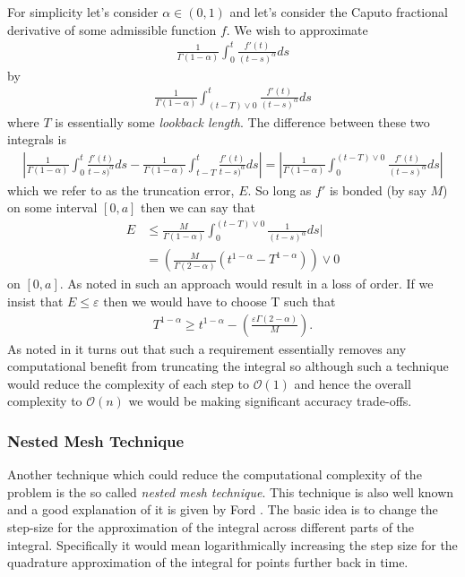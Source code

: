 For simplicity let's consider $ \alpha \in (0, 1) $ and let's consider the Caputo fractional derivative of some admissible function $ f $.
We wish to approximate
\begin{align}
	\frac{1}{\Gamma(1-\alpha)} \int_0^t \frac{f'(t)}{(t-s)^\alpha} ds
\end{align}
by
\begin{align}
	\frac{1}{\Gamma(1-\alpha)} \int_{({t-T})\vee 0}^t \frac{f'(t)}{(t-s)^\alpha} ds
\end{align}
where $ T $ is essentially some \emph{lookback length}.
The difference between these two integrals is 
\begin{align}
	\left| \frac{1}{\Gamma(1-\alpha)} \int_0^t \frac{f'(t)}{t-s)^\alpha} ds - \frac{1}{\Gamma(1-\alpha)} \int_{t-T}^t \frac{f'(t)}{t-s)^\alpha} ds \right| =  \left| \frac{1}{\Gamma(1-\alpha)} \int_{0}^{({t-T})\vee 0} \frac{f'(t)}{(t-s)^\alpha} ds \right|
\end{align}
which we refer to as the truncation error, $E$. So long as $ f' $ is bonded (by say $ M $) on some interval $ [0,a] $ then we can say that 
\begin{align}
	E &\leq \frac{M}{\Gamma(1-\alpha)} \int_0^{({t-T})\vee 0} \frac{1}{(t-s)^\alpha} ds| \\
		&= \left(\frac{M}{\Gamma(2 - \alpha)} (t^{1-\alpha} - T^{1-\alpha})\right)\vee 0
\end{align}
on $ [0,a] $.
As noted in \cite{Ford2001} such an approach would result in a loss of order. If we insist that $ E \leq \varepsilon $ then we would have to choose T such that
\begin{align}
	T^{1-\alpha} \geq t^{1-\alpha} - \left( \frac{\varepsilon \Gamma(2 - \alpha)}{M}\right).
\end{align}
As noted in \cite{Ford2001} it turns out that such a requirement essentially removes any computational benefit from truncating the integral so although such a technique would reduce the complexity of each step to $ \mathcal{O}(1) $ and hence the overall complexity to $ \mathcal{O}(n) $ we would be making significant accuracy trade-offs.

\subsubsection{Nested Mesh Technique}

Another technique which could reduce the computational complexity of the problem is the so called \emph{nested mesh technique}. This technique is also well known and a good explanation of it is given by Ford \cite{Ford2001}. The basic idea is to change the step-size for the approximation of the integral across different parts of the integral. Specifically it would mean logarithmically increasing the step size for the quadrature approximation of the integral for points further back in time. 

